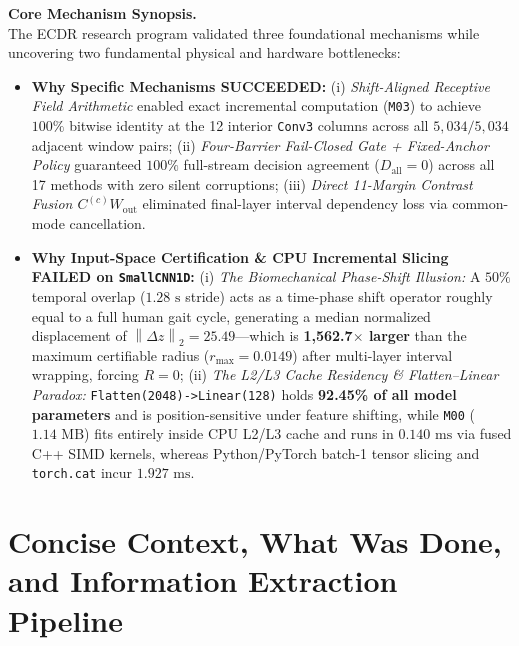 \documentclass[11pt,a4paper]{article}
\newcommand{\norm}[1]{\left\lVert #1\right\rVert}
\newcommand{\code}[1]{{\small\ttfamily\nolinkurl{#1}}}
\begin{document}
\begin{titlepage}
\vspace{0.45cm}
\noindent\colorbox{pale}{%
\parbox{\dimexpr\linewidth-2\fboxsep}{%
\textbf{\color{ink}Core Mechanism Synopsis.}\\[4pt]
The ECDR research program validated three foundational mechanisms while uncovering two fundamental physical and hardware bottlenecks:
\begin{itemize}[leftmargin=1.4em]
  \item \textbf{Why Specific Mechanisms SUCCEEDED:}
    (i) \textit{Shift-Aligned Receptive Field Arithmetic} enabled exact incremental computation (\code{M03}) to achieve $100\%$ bitwise identity at the 12 interior \code{Conv3} columns across all $5,034/5,034$ adjacent window pairs;
    (ii) \textit{Four-Barrier Fail-Closed Gate + Fixed-Anchor Policy} guaranteed $100\%$ full-stream decision agreement ($D_{\text{all}} = 0$) across all 17 methods with zero silent corruptions;
    (iii) \textit{Direct 11-Margin Contrast Fusion $C^{(c)} W_{\text{out}}$} eliminated final-layer interval dependency loss via common-mode cancellation.
  \item \textbf{Why Input-Space Certification \& CPU Incremental Slicing FAILED on \code{SmallCNN1D}:}
    (i) \textit{The Biomechanical Phase-Shift Illusion:} A $50\%$ temporal overlap ($1.28\text{ s}$ stride) acts as a time-phase shift operator roughly equal to a full human gait cycle, generating a median normalized displacement of $\norm{\Delta z}_2 = 25.49$---which is \textbf{1,562.7$\times$ larger} than the maximum certifiable radius ($r_{\max} = 0.0149$) after multi-layer interval wrapping, forcing $R = 0$;
    (ii) \textit{The L2/L3 Cache Residency \& Flatten--Linear Paradox:} \code{Flatten(2048)->Linear(128)} holds \textbf{92.45\% of all model parameters} and is position-sensitive under feature shifting, while \code{M00} ($1.14\text{ MB}$) fits entirely inside CPU L2/L3 cache and runs in $0.140\text{ ms}$ via fused C++ SIMD kernels, whereas Python/PyTorch batch-1 tensor slicing and \code{torch.cat} incur $1.927\text{ ms}$.
\end{itemize}
}}
\vfill
\end{titlepage}
\hypersetup{pageanchor=true}

\begingroup\small\setlength{\parskip}{1pt}\tableofcontents\endgroup
\clearpage

\section{Concise Context, What Was Done, and Information Extraction Pipeline}
\end{document}
